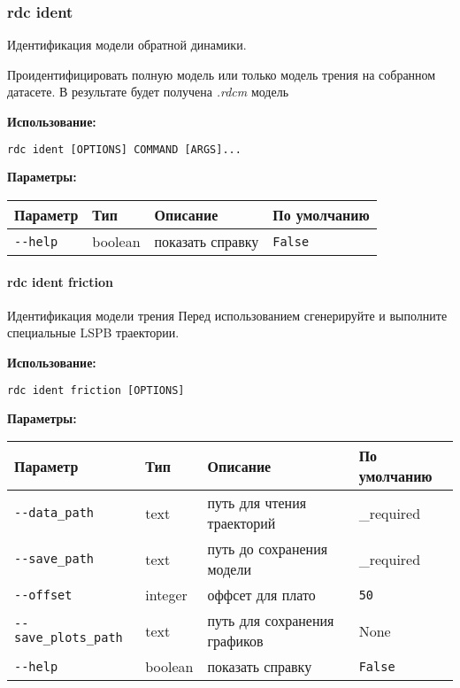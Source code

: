 \hypertarget{rdc-ident}{%
\subsubsection{rdc ident}\label{rdc-ident}}

Идентификация модели обратной динамики.

Проидентифицировать полную модель или только модель трения на собранном датасете. В результате будет получена \textit{.rdcm} модель

\textbf{Использование:}
\begin{lstlisting}[language=python, numbers=none, frame=single]
rdc ident [OPTIONS] COMMAND [ARGS]...
\end{lstlisting}

\textbf{Параметры:}
\begin{center}
\fontsize{10pt}{10pt}\selectfont
\begin{longtable}[]{p{5cm}|p{2cm}|p{3.5cm}|p{5cm}}
    \hline
\toprule()
Параметр & Тип & Описание & По умолчанию \\
\hline
\midrule()
\endhead
\texttt{-\/-help} & boolean & показать справку &
\texttt{False} \\
\bottomrule()
\hline
\end{longtable}
\end{center}

\hypertarget{rdc-ident-friction}{%
\paragraph{rdc ident friction}\label{rdc-ident-friction}}
Идентификация модели трения
Перед использованием сгенерируйте и выполните специальные LSPB траектории.

\textbf{Использование:}
\begin{lstlisting}[language=python, numbers=none, frame=single]
rdc ident friction [OPTIONS]
\end{lstlisting}

\textbf{Параметры:}
\begin{center}
\fontsize{10pt}{10pt}\selectfont
\begin{longtable}[]{p{5cm}|p{2cm}|p{3.5cm}|p{5cm}}
    \hline
\toprule()
Параметр & Тип & Описание & По умолчанию \\
\hline
\midrule()
\endhead
\texttt{-\/-data\_path} & text & путь для чтения траекторий &
\_required \\
\hline
\texttt{-\/-save\_path} & text & путь до сохранения модели & \_required \\
\hline
\texttt{-\/-offset} & integer & оффсет для плато & \texttt{50} \\
\hline
\texttt{-\/-save\_plots\_path} & text & путь для сохранения графиков & None \\
\hline
\texttt{-\/-help} & boolean & показать справку &
\texttt{False} \\
\hline
\bottomrule()
\hline
\end{longtable}
\end{center}

